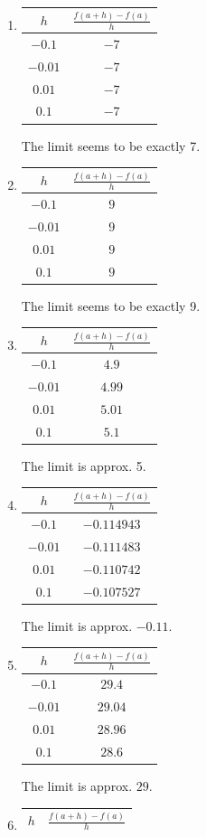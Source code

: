 \begin{multicols}{2}
\begin{enumialphparenastyle}
\begin{ex}
\begin{sol}
\begin{enumerate}
\item 
{\begin{tabular}{cc}
$h$ & $\frac{f(a+h)-f(a)}{h}$\\ \hline 
 $-0.1$ & $-7$ \\
 $-0.01$ & $-7$ \\
 $0.01$ & $-7$ \\
 $0.1$ & $-7$
\end{tabular}
The limit seems to be exactly 7.
}
\item 
{\begin{tabular}{cc}
$h$ & $\frac{f(a+h)-f(a)}{h}$\\ \hline 
 $-0.1$ & $9$ \\
 $-0.01$ & $9$ \\
 $0.01$ & $9$ \\
 $0.1$ & $9$
\end{tabular}
The limit seems to be exactly 9.
}
\item 
{\begin{tabular}{cc}
$h$ & $\frac{f(a+h)-f(a)}{h}$\\ \hline 
 $-0.1$ & $4.9$ \\
 $-0.01$ & $4.99$ \\
 $0.01$ & $5.01$ \\
 $0.1$ & $5.1$
\end{tabular}
The limit is approx. 5.
}
\item 
{\begin{tabular}{cc}
$h$ & $\frac{f(a+h)-f(a)}{h}$\\ \hline
 $-0.1$ & $-0.114943$ \\
 $-0.01$ & $-0.111483$ \\
 $0.01$ & $-0.110742$ \\
 $0.1$ & $-0.107527$
\end{tabular}
The limit is approx. $-0.11$.
}
\item 
{\begin{tabular}{cc}
$h$ & $\frac{f(a+h)-f(a)}{h}$\\ \hline 
 $-0.1$ & $29.4$ \\
 $-0.01$ & $29.04$ \\
 $0.01$ & $28.96$ \\
 $0.1$ & $28.6$
\end{tabular}
The limit is approx. $29$.
}
\item 
{\begin{tabular}{cc}
$h$ & $\frac{f(a+h)-f(a)}{h}$\\ \hline

\end{tabular}}
\end{enumerate}
\end{sol}
\end{ex}
\end{enumialphparenastyle}
\end{multicols}
